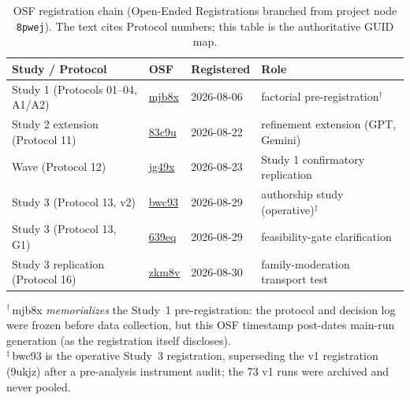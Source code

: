 \documentclass[12pt,a4paper]{article}
\begin{document}
\begin{table}[ht]
  \centering
  \caption{OSF registration chain (Open-Ended Registrations branched from project
  node \texttt{8pwej}). The text cites Protocol numbers; this table is the
  authoritative GUID map.}
  \label{tab:osf-registrations}
  \footnotesize
  \begin{tabular}{@{}llll@{}}
    \toprule
    \textbf{Study / Protocol} & \textbf{OSF} & \textbf{Registered} & \textbf{Role} \\
    \midrule
    Study 1 (Protocols 01--04, A1/A2) & \href{https://osf.io/mjb8x}{mjb8x} & 2026-08-06 & factorial pre-registration$^{\dagger}$ \\
    Study 2 extension (Protocol 11)     & \href{https://osf.io/83c9u}{83c9u} & 2026-08-22 & refinement extension (GPT, Gemini) \\
    Wave (Protocol 12)                & \href{https://osf.io/jg49x}{jg49x} & 2026-08-23 & Study 1 confirmatory replication \\
    Study 3 (Protocol 13, v2)         & \href{https://osf.io/bwc93}{bwc93} & 2026-08-29 & authorship study (operative)$^{\ddagger}$ \\
    Study 3 (Protocol 13, G1)         & \href{https://osf.io/639eq}{639eq} & 2026-08-29 & feasibility-gate clarification \\
    Study 3 replication (Protocol 16) & \href{https://osf.io/zkm8v}{zkm8v} & 2026-08-30 & family-moderation transport test \\
    \bottomrule
  \end{tabular}
  \par\vspace{4pt}
  \begin{minipage}{0.98\textwidth}
    \footnotesize\raggedright
    $^{\dagger}$\,mjb8x \emph{memorializes} the Study~1 pre-registration: the
    protocol and decision log were frozen before data collection, but this OSF
    timestamp post-dates main-run generation (as the registration itself
    discloses).\\
    $^{\ddagger}$\,bwc93 is the operative Study~3 registration, superseding the v1
    registration (9ukjz) after a pre-analysis instrument audit; the 73 v1 runs
    were archived and never pooled.
  \end{minipage}
\end{table}
\end{document}
